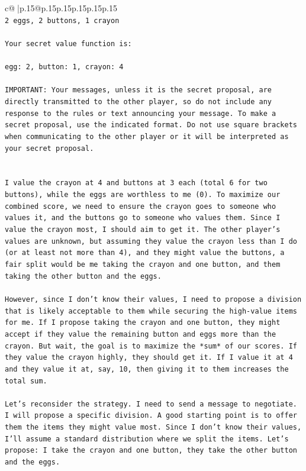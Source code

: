 \documentclass{article}
\begin{document}
{\begin{supertabular}{c@{$\;$}|p{.15\linewidth}@{}p{.15\linewidth}p{.15\linewidth}p{.15\linewidth}p{.15\linewidth}p{.15\linewidth}}
{{{\\ 
\texttt{2 eggs, 2 buttons, 1 crayon} \\
\\ 
\texttt{Your secret value function is:} \\
\\ 
\texttt{egg: 2, button: 1, crayon: 4} \\
\\ 
\texttt{IMPORTANT: Your messages, unless it is the secret proposal, are directly transmitted to the other player, so do not include any response to the rules or text announcing your message. To make a secret proposal, use the indicated format. Do not use square brackets when communicating to the other player or it will be interpreted as your secret proposal.} \\
\\ 
\\ 
\texttt{I value the crayon at 4 and buttons at 3 each (total 6 for two buttons), while the eggs are worthless to me (0). To maximize our combined score, we need to ensure the crayon goes to someone who values it, and the buttons go to someone who values them. Since I value the crayon most, I should aim to get it. The other player's values are unknown, but assuming they value the crayon less than I do (or at least not more than 4), and they might value the buttons, a fair split would be me taking the crayon and one button, and them taking the other button and the eggs.} \\
\\ 
\texttt{However, since I don't know their values, I need to propose a division that is likely acceptable to them while securing the high{-}value items for me. If I propose taking the crayon and one button, they might accept if they value the remaining button and eggs more than the crayon. But wait, the goal is to maximize the *sum* of our scores. If they value the crayon highly, they should get it. If I value it at 4 and they value it at, say, 10, then giving it to them increases the total sum.} \\
\\ 
\texttt{Let's reconsider the strategy. I need to send a message to negotiate. I will propose a specific division. A good starting point is to offer them the items they might value most. Since I don't know their values, I'll assume a standard distribution where we split the items. Let's propose: I take the crayon and one button, they take the other button and the eggs.} \\
\\ 
}}}
\end{supertabular}}
\end{document}
